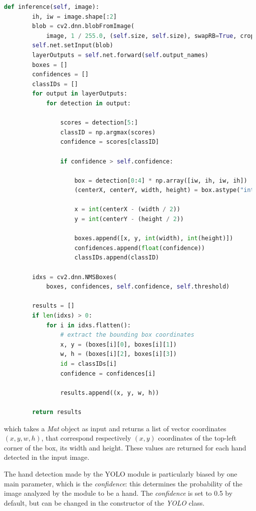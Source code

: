\begin{lstlisting}[language = python]
    def inference(self, image):
        ih, iw = image.shape[:2]
        blob = cv2.dnn.blobFromImage(
            image, 1 / 255.0, (self.size, self.size), swapRB=True, crop=False)
        self.net.setInput(blob)
        layerOutputs = self.net.forward(self.output_names)
        boxes = []
        confidences = []
        classIDs = []
        for output in layerOutputs:
            for detection in output:

                scores = detection[5:]
                classID = np.argmax(scores)
                confidence = scores[classID]

                if confidence > self.confidence:

                    box = detection[0:4] * np.array([iw, ih, iw, ih])
                    (centerX, centerY, width, height) = box.astype("int")

                    x = int(centerX - (width / 2))
                    y = int(centerY - (height / 2))

                    boxes.append([x, y, int(width), int(height)])
                    confidences.append(float(confidence))
                    classIDs.append(classID)

        idxs = cv2.dnn.NMSBoxes(
            boxes, confidences, self.confidence, self.threshold)

        results = []
        if len(idxs) > 0:
            for i in idxs.flatten():
                # extract the bounding box coordinates
                x, y = (boxes[i][0], boxes[i][1])
                w, h = (boxes[i][2], boxes[i][3])
                id = classIDs[i]
                confidence = confidences[i]

                results.append((x, y, w, h))

        return results
\end{lstlisting}

which takes a \textit{Mat} object as input and returns a list of vector
coordinates $(x,y,w,h)$, that correspond respectively $(x,y)$
coordinates of the top-left corner of the box, its width and height. These
values are returned for each hand detected in the input image.

The hand detection made by the YOLO module is particularly biased by one main
parameter, which is the \textit{confidence}: this determines the
probability of the image analyzed by the module to be a hand. The
\textit{confidence} is set to 0.5 by default, but can be changed in the
constructor of the \textit{YOLO} class.

